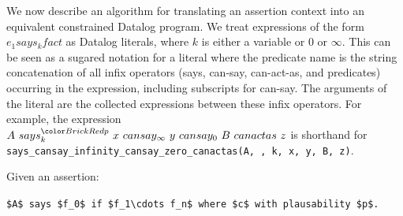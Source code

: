 \documentclass[thesis.tex]{subfiles}
\begin{document}
We now describe an algorithm for translating an assertion context into
an equivalent constrained Datalog program. We treat expressions of the
form $e_1 says_k fact$ as Datalog literals, where $k$ is either a
variable or 0 or $\infty$. This can be seen as a sugared notation for
a literal where the predicate name is the string concatenation of all
infix operators (\textsf{says}, \textsf{can-say}, \textsf{can-act-as},
and predicates) occurring in the expression, including subscripts for
\textsf{can-say}. The arguments of the literal are the collected
expressions between these infix operators. For example, the expression
$A~says_k^{\new{p}}~x~can say_\infty~y~can say_0~B~can act as~z$ is
shorthand for
\texttt{says\_cansay\_infinity\_cansay\_zero\_canactas(A, , k,
x, y, B, z)}.

Given an assertion: 

\begin{center} \lstinline!$A$ says $f_0$ if $f_1\cdots f_n$ where $c$ with plausability $p$.! \end{center}
\end{document}
